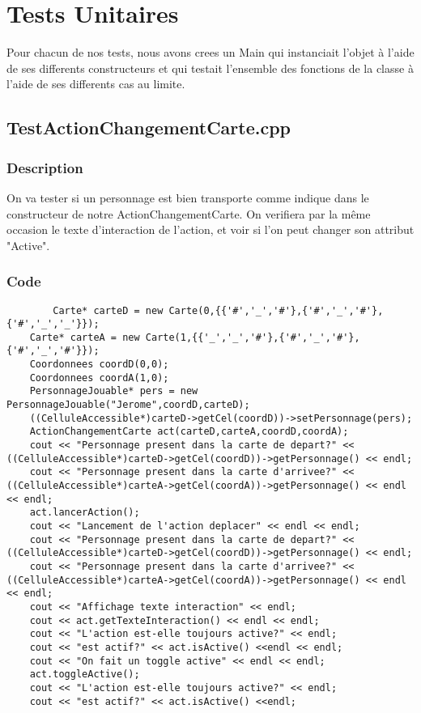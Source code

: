 \chapter{Tests Unitaires}
    Pour chacun de nos tests, nous avons crees un Main qui instanciait l'objet à l'aide de ses differents constructeurs et qui testait l'ensemble des fonctions de la classe à l'aide de ses differents cas au limite.
    \section{TestActionChangementCarte.cpp}
        \subsection{Description}
            On va tester si un personnage est bien transporte comme indique dans le constructeur de notre ActionChangementCarte. On verifiera par la même occasion le texte d'interaction de l'action, et voir si l'on peut changer son attribut "Active".
        \subsection{Code}
	\begin{lstlisting}
		Carte* carteD = new Carte(0,{{'#','_','#'},{'#','_','#'},{'#','_','_'}});
	Carte* carteA = new Carte(1,{{'_','_','#'},{'#','_','#'},{'#','_','#'}});
	Coordonnees coordD(0,0);
	Coordonnees coordA(1,0);
	PersonnageJouable* pers = new PersonnageJouable("Jerome",coordD,carteD);
	((CelluleAccessible*)carteD->getCel(coordD))->setPersonnage(pers);
	ActionChangementCarte act(carteD,carteA,coordD,coordA);
	cout << "Personnage present dans la carte de depart?" << ((CelluleAccessible*)carteD->getCel(coordD))->getPersonnage() << endl;
	cout << "Personnage present dans la carte d'arrivee?" << ((CelluleAccessible*)carteA->getCel(coordA))->getPersonnage() << endl << endl;
	act.lancerAction();
	cout << "Lancement de l'action deplacer" << endl << endl;
	cout << "Personnage present dans la carte de depart?" << ((CelluleAccessible*)carteD->getCel(coordD))->getPersonnage() << endl;
	cout << "Personnage present dans la carte d'arrivee?" << ((CelluleAccessible*)carteA->getCel(coordA))->getPersonnage() << endl << endl;
	cout << "Affichage texte interaction" << endl;
	cout << act.getTexteInteraction() << endl << endl;
	cout << "L'action est-elle toujours active?" << endl;
	cout << "est actif?" << act.isActive() <<endl << endl;
	cout << "On fait un toggle active" << endl << endl;
	act.toggleActive();
	cout << "L'action est-elle toujours active?" << endl;
	cout << "est actif?" << act.isActive() <<endl;
	\end{lstlisting}
